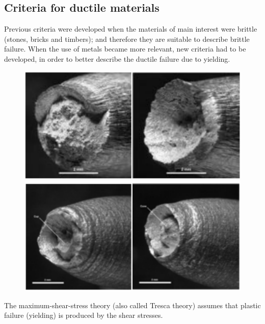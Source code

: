 \documentclass[class=report, crop=false, 12pt,a4paper]{standalone}
\begin{document}
\subsection{Criteria for ductile materials}
Previous criteria were developed when the materials of main interest were brittle (stones, bricks and timbers); and therefore they are suitable to describe brittle failure. When the use of metals became more relevant, new criteria had to be developed, in order to better describe the ductile failure due to yielding. 
\begin{figure}
  \begin{center}
    \begin{minipage}[b]{0.46\textwidth}
      \centering
      \includegraphics[width = \textwidth]{../img/diagram20.png}
      \caption{}
    \end{minipage}
    \begin{minipage}[b]{0.46\textwidth}
      \centering
      \includegraphics[width = \textwidth]{../img/diagram21.png}
      \caption{}
    \end{minipage}
  \end{center}
\end{figure}
The maximum-shear-stress theory (also called Tresca theory) assumes that plastic failure (yielding) is produced by the shear stresses. 
\end{document}
